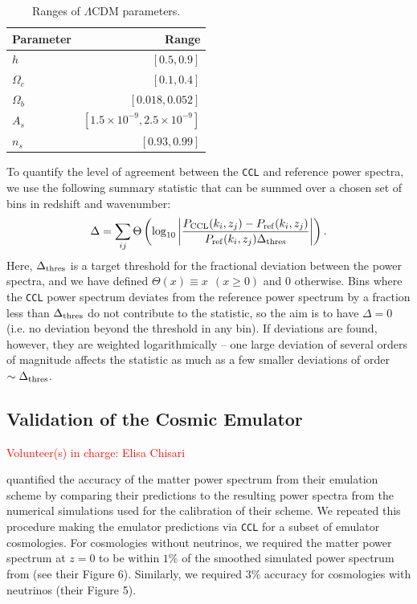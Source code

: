 \documentclass[\docopts]{\docclass}
\newcommand{\vol}[1]{\textcolor{red}{Volunteer(s) in charge: #1}}
\newcommand{\ccl}{{\tt CCL}\xspace}
\begin{document}
\begin{table}[t]
  \centering
  \begin{tabular}{l | r}
    \hline
    Parameter & Range \\
    \hline
    $h$ & $[0.5, 0.9]$ \\
    $\Omega_c$ & $[0.1, 0.4]$ \\
    $\Omega_b$ & $[0.018, 0.052]$ \\
    $A_s$ & $[1.5 \times 10^{-9}, 2.5 \times 10^{-9}]$ \\
    $n_s$ & $[0.93, 0.99]$ \\
    \hline
  \end{tabular}
  \caption{Ranges of $\Lambda$CDM parameters.}
  \label{tab:paramranges}
\end{table}

To quantify the level of agreement between the \ccl and reference power spectra, we use the following summary statistic that can be summed over a chosen set of bins in redshift and wavenumber:
\begin{equation}
\Delta = \sum_{ij} \Theta \left ( \log_{10} \left | \frac{P_{\rm CCL}(k_i, z_j) - P_{\rm ref}(k_i, z_j)}{P_{\rm ref}(k_i, z_j) \Delta_{\rm thres}} \right | \right ).
\end{equation}
Here, $\Delta_{\rm thres}$ is a target threshold for the fractional deviation between the power spectra, and we have defined $\Theta(x) \equiv x ~~(x \ge 0)$ and $0$ otherwise. Bins where the \ccl power spectrum deviates from the reference power spectrum by a fraction less than $\Delta_{\rm thres}$ do not contribute to the statistic, so the aim is to have $\Delta = 0$ (i.e. no deviation beyond the threshold in any bin). If deviations are found, however, they are weighted logarithmically -- one large deviation of several orders of magnitude affects the statistic as much as a few smaller deviations of order $\sim \Delta_{\rm thres}$.

\subsection{Validation of the Cosmic Emulator}
\vol{Elisa Chisari}

\citet{Lawrence17} quantified the accuracy of the matter power spectrum from their emulation scheme by comparing their predictions to the resulting power spectra from the numerical simulations used for the calibration of their scheme. We repeated this procedure making the emulator predictions via \ccl for a subset of emulator cosmologies. For cosmologies without neutrinos, we required the matter power spectrum at $z=0$ to be within $1\%$ of the smoothed simulated power spectrum from \citet{Lawrence17} (see their Figure 6). Similarly, we required $3\%$ accuracy for cosmologies with neutrinos (their Figure 5). 
\end{document}
